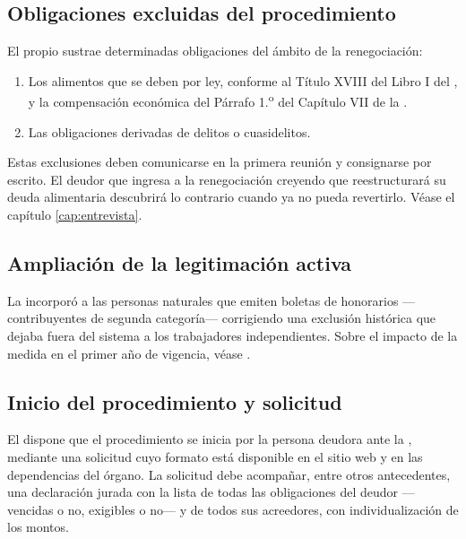 \subsection{Obligaciones excluidas del procedimiento}

El propio  sustrae determinadas obligaciones del ámbito de la renegociación:

\begin{enumerate}
  \item Los alimentos que se deben por ley, conforme al Título XVIII del Libro I del
  \cc{}, y la compensación económica del Párrafo 1.\textsuperscript{o} del Capítulo VII
  de la .
  \item Las obligaciones derivadas de delitos o cuasidelitos.
\end{enumerate}

\begin{alerta}
Estas exclusiones deben comunicarse en la primera reunión y consignarse por escrito. El
deudor que ingresa a la renegociación creyendo que reestructurará su deuda alimentaria
descubrirá lo contrario cuando ya no pueda revertirlo. Véase el capítulo
\ref{cap:entrevista}.
\end{alerta}

\subsection{Ampliación de la legitimación activa}

La \Lreforma{} \citeyearpar{ley-21563} incorporó a las personas naturales que emiten
boletas de honorarios ---contribuyentes de segunda categoría--- corrigiendo una exclusión
histórica que dejaba fuera del sistema a los trabajadores independientes. Sobre el impacto
de la medida en el primer año de vigencia, véase \textcite{superir-balance-primer-ano}.

\subsection{Inicio del procedimiento y solicitud}

El  dispone que el procedimiento se inicia por la persona deudora ante la
\superir{}, mediante una solicitud cuyo formato está disponible en el sitio web y en las
dependencias del órgano. La solicitud debe acompañar, entre otros antecedentes, una
declaración jurada con la lista de todas las obligaciones del deudor ---vencidas o no,
exigibles o no--- y de todos sus acreedores, con individualización de los montos.

